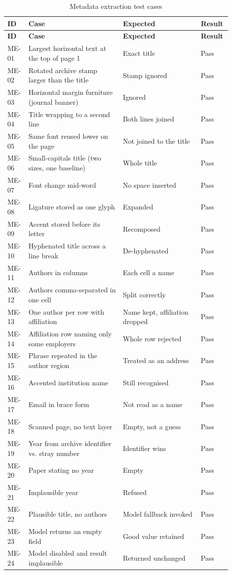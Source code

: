 \documentclass[12pt,a4paper]{report}
\begin{document}
\begin{longtable}{@{}p{0.07\linewidth}p{0.40\linewidth}p{0.33\linewidth}p{0.10\linewidth}@{}}
\caption{Metadata extraction test cases}\label{tab:me}\\
\toprule
\textbf{ID} & \textbf{Case} & \textbf{Expected} & \textbf{Result} \\
\midrule
\endfirsthead
\toprule
\textbf{ID} & \textbf{Case} & \textbf{Expected} & \textbf{Result} \\
\midrule
\endhead

ME-01 & Largest horizontal text at the top of page 1 & Exact title & Pass \\
ME-02 & Rotated archive stamp larger than the title & Stamp ignored & Pass \\
ME-03 & Horizontal margin furniture (journal banner) & Ignored & Pass \\
ME-04 & Title wrapping to a second line & Both lines joined & Pass \\
ME-05 & Same font reused lower on the page & Not joined to the title & Pass \\
ME-06 & Small-capitals title (two sizes, one baseline) & Whole title & Pass \\
ME-07 & Font change mid-word & No space inserted & Pass \\
ME-08 & Ligature stored as one glyph & Expanded & Pass \\
ME-09 & Accent stored before its letter & Recomposed & Pass \\
ME-10 & Hyphenated title across a line break & De-hyphenated & Pass \\
ME-11 & Authors in columns & Each cell a name & Pass \\
ME-12 & Authors comma-separated in one cell & Split correctly & Pass \\
ME-13 & One author per row with affiliation & Name kept, affiliation dropped
  & Pass \\
ME-14 & Affiliation row naming only some employers & Whole row rejected
  & Pass \\
ME-15 & Phrase repeated in the author region & Treated as an address & Pass \\
ME-16 & Accented institution name & Still recognised & Pass \\
ME-17 & Email in brace form & Not read as a name & Pass \\
ME-18 & Scanned page, no text layer & Empty, not a guess & Pass \\
ME-19 & Year from archive identifier vs. stray number & Identifier wins
  & Pass \\
ME-20 & Paper stating no year & Empty & Pass \\
ME-21 & Implausible year & Refused & Pass \\
ME-22 & Plausible title, no authors & Model fallback invoked & Pass \\
ME-23 & Model returns an empty field & Good value retained & Pass \\
ME-24 & Model disabled and result implausible & Returned unchanged & Pass \\
\bottomrule
\end{longtable}
\end{document}

